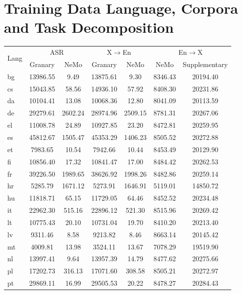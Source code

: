 \section{Training Data Language, Corpora and Task Decomposition}\label{app:lang_dist}
\begin{table}[ht]
\centering
\scriptsize
\setlength{\tabcolsep}{4pt}
\setlength{\abovecaptionskip}{10pt} %
\renewcommand{\arraystretch}{1.1}
\begin{tabular}{l|cc|cc|cc}
\hline
\multirow{2}{*}{Lang} & \multicolumn{2}{c|}{ASR} & \multicolumn{2}{c|}{X$\to$En} & \multicolumn{2}{c}{En$\to$X} \\
 & Granary & NeMo & Granary & NeMo & NeMo & Supplementary \\
\hline
bg & 13986.55 & 9.49 & 13875.61 & 9.30 & 8346.43 & 20194.40 \\
cs & 15043.85 & 58.56 & 14936.10 & 57.92 & 8408.30 & 20231.86 \\
da & 10104.41 & 13.08 & 10068.36 & 12.80 & 8041.09 & 20113.59 \\
de & 29279.61 & 2602.24 & 28974.96 & 2509.15 & 8781.31 & 20267.06 \\
el & 11008.78 & 24.89 & 10927.85 & 23.20 & 8472.81 & 20259.95 \\
es & 45812.67 & 1505.47 & 45353.29 & 1406.23 & 8505.52 & 20272.88 \\
et & 7983.65 & 10.54 & 7942.66 & 10.44 & 8453.49 & 20129.90 \\
fi & 10856.40 & 17.32 & 10841.47 & 17.00 & 8484.42 & 20262.53 \\
fr & 39226.50 & 1989.65 & 38626.92 & 1998.26 & 8482.86 & 20259.14 \\
hr & 5285.79 & 1671.12 & 5273.91 & 1646.91 & 5119.01 & 14850.72 \\
hu & 11818.71 & 65.15 & 11729.05 & 64.46 & 8452.52 & 20234.48 \\
it & 22962.30 & 515.16 & 22896.12 & 521.30 & 8515.96 & 20269.42 \\
lt & 10775.43 & 20.10 & 10731.04 & 19.70 & 8410.20 & 20213.40 \\
lv & 9311.46 & 8.58 & 9213.82 & 8.46 & 8663.14 & 20145.42 \\
mt & 4009.81 & 13.98 & 3524.11 & 13.67 & 7078.29 & 19519.90 \\
nl & 13997.41 & 9.64 & 13957.39 & 14.79 & 8477.62 & 20275.66 \\
pl & 17202.73 & 316.13 & 17071.60 & 308.58 & 8505.21 & 20272.97 \\
pt & 29869.11 & 16.99 & 29505.53 & 20.22 & 8478.27 & 20284.43 \\

\end{tabular}
\end{table}

